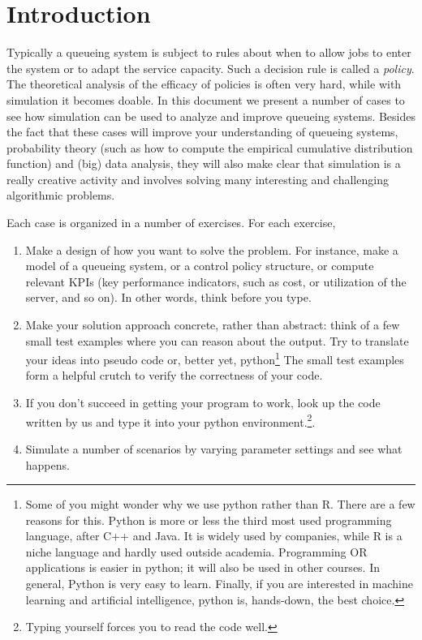 \section*{Introduction}

Typically a queueing system is subject to rules about when to allow jobs to enter the system or to adapt the service capacity.
Such a decision rule is called a \emph{policy}.
The theoretical analysis of the efficacy of policies is often very hard, while with simulation it becomes doable.
In this document we present a number of cases to see how simulation can be used to analyze and improve queueing systems.
Besides the fact that these cases will improve your understanding of queueing systems, probability theory (such as how to compute the empirical cumulative distribution function) and (big) data analysis, they will also make clear that simulation is a really creative activity and involves solving many interesting and challenging algorithmic problems.


Each case is organized in a number of exercises.
For each exercise,
\begin{enumerate}
\item Make a design of how you want to solve the problem.
  For instance, make a model of a queueing system, or a control policy structure, or compute relevant KPIs (key performance indicators, such as cost, or utilization of the server, and so on).
  In other words, think before you type.
\item Make your solution approach concrete, rather than abstract: think of a few small test examples where you can reason about the output. Try to translate your ideas into pseudo code or, better yet, python\footnote{Some of you might wonder why we use python rather than R.
    There are a few reasons for this.
    Python is more or less the third most used programming language, after C++ and Java.
    It is widely used by companies, while R is a niche language and hardly used outside academia.
    Programming OR applications is easier in python; it will also be used in other courses.
    In general, Python is very easy to learn.
    Finally, if you are interested in machine learning and artificial intelligence, python is, hands-down, the best choice.}
The small test examples form a helpful crutch to verify the correctness of your code.
  \item If you don't succeed in getting your program to work,  look up the code written by us and type it into your python environment.\footnote{Typing yourself forces you to read the code well.}.
  \item Simulate a number of scenarios by varying parameter settings and see what happens.
\end{enumerate}

